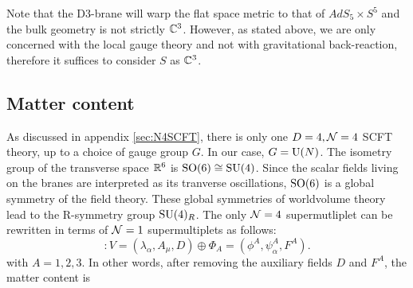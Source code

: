         Note that the D$3$-brane will warp the flat space metric to that of $AdS_5\times S^5$ and the bulk geometry is not strictly $\mathbb{C}^3$. However, as stated above, we are only concerned with the local gauge theory and not with gravitational back-reaction, therefore it suffices to consider $S$ as $\mathbb{C}^3$.

    \subsection{Matter content}

        As discussed in appendix \ref{sec:N4SCFT}, there is only one $D=4,\mathcal{N}=4$ SCFT theory, up to a choice of gauge group $G$. In our case, $G=\text{U}(N)$. The isometry group of the transverse space $\mathbb{R}^6$ is $\text{SO}(6)\cong\text{SU}(4)$. Since the scalar fields living on the branes are interpreted as its tranverse oscillations, $\text{SO}(6)$ is a global symmetry of the field theory. These global symmetries of worldvolume theory lead to the R-symmetry group $\text{SU}(4)_R$. The only $\mathcal{N}=4$ supermutliplet can be rewritten in terms of $\mathcal{N}=1$ supermultiplets as follows:
        \begin{equation}
            [\mN = 4 \text{ vector multiplet}] : V = (\lambda_\alpha, A_\mu, D) \oplus \Phi_A = (\phi^A,\psi^A_\alpha,F^A).
        \end{equation}
        with $A=1,2,3$. In other words, after removing the auxiliary fields $D$ and $F^A$, the matter content is
